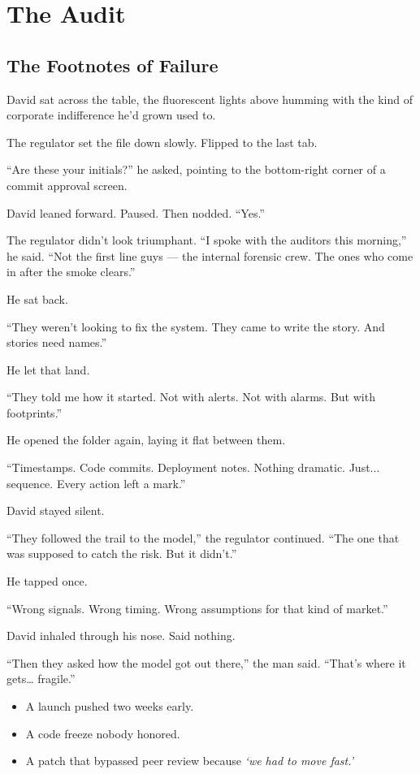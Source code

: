 
\section{The Audit}

\subsection{The Footnotes of Failure}

David sat across the table, the fluorescent lights above humming with the kind of corporate 
indifference he’d grown used to.

The regulator set the file down slowly. Flipped to the last tab.

“Are these your initials?” he asked, pointing to the bottom-right corner of a commit approval screen.

David leaned forward. Paused. Then nodded.
“Yes.”

The regulator didn’t look triumphant. 
“I spoke with the auditors this morning,” he said. “Not the first line guys — the internal 
forensic crew. The ones who come in after the smoke clears.”

He sat back.

“They weren’t looking to fix the system. They came to write the story. And stories need names.”

He let that land.

“They told me how it started. Not with alerts. Not with alarms. But with footprints.”

He opened the folder again, laying it flat between them.

“Timestamps. Code commits. Deployment notes. Nothing dramatic. Just... sequence. Every action 
left a mark.”

David stayed silent.

“They followed the trail to the model,” the regulator continued. “The one that was supposed to 
catch the risk. But it didn’t.”

He tapped once.

“Wrong signals. Wrong timing. Wrong assumptions for that kind of market.”

David inhaled through his nose. Said nothing.

“Then they asked how the model got out there,” the man said. “That’s where it gets… fragile.”

\begin{itemize}
  \item A launch pushed two weeks early.
  \item A code freeze nobody honored.
  \item A patch that bypassed peer review because \textit{‘we had to move fast.’}
\end{itemize}

